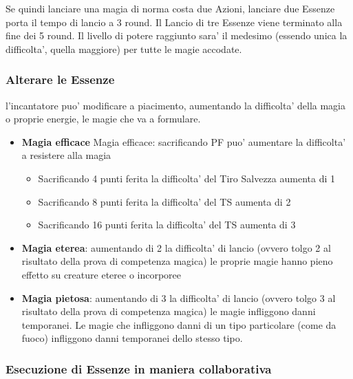 \documentclass[a4paper,11pt,twoside,openany]{book}
\begin{document}
	Se quindi lanciare una magia di norma costa due Azioni, lanciare due Essenze porta il tempo di lancio a 3 round. Il Lancio di tre Essenze viene terminato alla fine dei 5 round. Il livello di potere raggiunto sara' il medesimo (essendo unica la difficolta', quella maggiore) per tutte le magie accodate.
	
	\subsubsection{Alterare le Essenze}
	
	\label{alterare-le-essenze}
	
	l'incantatore puo' modificare a piacimento, aumentando la difficolta' della magia o proprie energie, le magie che va a formulare.
	
	\begin{itemize}
		\item 
		\textbf{Magia efficace} 
		Magia efficace: sacrificando PF puo’ aumentare la difficolta’ a resistere alla magia
		\begin{itemize}
			\item Sacrificando 4 punti ferita la difficolta’ del Tiro Salvezza aumenta di 1
			\item Sacrificando 8 punti ferita la difficolta’ del TS aumenta di 2
			
			\item Sacrificando 16 punti ferita la difficolta’ del TS aumenta di 3
		\end{itemize}
	\end{itemize}
	\begin{itemize}
		\item 
		\textbf{Magia eterea}: aumentando di 2 la difficolta' di lancio (ovvero tolgo 2 al risultato della prova di competenza magica) le proprie magie hanno pieno effetto su creature eteree o incorporee 
	\end{itemize}
	\begin{itemize}
		\item 
		\textbf{Magia pietosa}: aumentando di 3 la difficolta' di lancio (ovvero tolgo 3 al risultato della prova di competenza magica) le magie infliggono danni temporanei. Le magie che infliggono danni di un tipo particolare (come da fuoco) infliggono danni temporanei dello stesso tipo. 
	\end{itemize}
	
	\subsubsection{Esecuzione di Essenze in maniera collaborativa}
	
\end{document}
